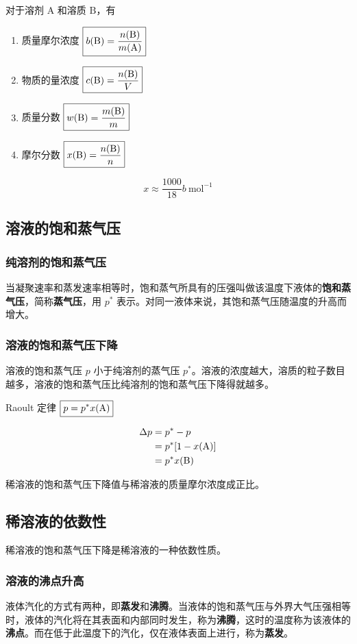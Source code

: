 对于溶剂 $\mathrm{A}$ 和溶质 $\mathrm{B}$，有
\begin{enumerate}
    \item 质量摩尔浓度 $\boxed{b({\rm B})=\dfrac{n({\rm B})}{m({\rm A})}}$
    \item 物质的量浓度 $\boxed{c({\rm B})=\dfrac{n({\rm B})}{V}}$
    \item 质量分数 $\boxed{w({\rm B})=\dfrac{m({\rm B})}{m}}$
    \item 摩尔分数 $\boxed{x({\rm B})=\dfrac{n({\rm B})}{n}}$
\end{enumerate}
\[
x \approx \dfrac{1000}{18}b~\mathrm{mol^{-1}}
\]

\subsection{溶液的饱和蒸气压}
\subsubsection{纯溶剂的饱和蒸气压}
当凝聚速率和蒸发速率相等时，饱和蒸气所具有的压强叫做该温度下液体的\textbf{饱和蒸气压}，简称\textbf{蒸气压}，用 $p^*$ 表示。对同一液体来说，其饱和蒸气压随温度的升高而增大。

\subsubsection{溶液的饱和蒸气压下降}
溶液的饱和蒸气压 $p$ 小于纯溶剂的蒸气压 $p^*$。溶液的浓度越大，溶质的粒子数目越多，溶液的饱和蒸气压比纯溶剂的饱和蒸气压下降得就越多。

Raoult 定律 $\boxed{p=p^*x({\rm A})}$

\[
\begin{aligned}
\Delta p &= p^*-p \\
&=p^*[1-x({\rm A})] \\
&=p^*x({\rm B})
\end{aligned}
\]

稀溶液的饱和蒸气压下降值与稀溶液的质量摩尔浓度成正比。

\subsection{稀溶液的依数性}
稀溶液的饱和蒸气压下降是稀溶液的一种依数性质。

\subsubsection{溶液的沸点升高}
液体汽化的方式有两种，即\textbf{蒸发}和\textbf{沸腾}。当液体的饱和蒸气压与外界大气压强相等时，液体的汽化将在其表面和内部同时发生，称为\textbf{沸腾}，这时的温度称为该液体的\textbf{沸点}。而在低于此温度下的汽化，仅在液体表面上进行，称为\textbf{蒸发}。

